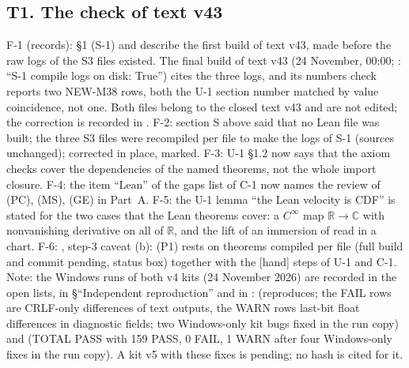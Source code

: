 \subsection*{T1. The check of text v43}
F-1 (records):  \S1 (S-1) and  describe the first build of text v43, made before the raw logs of the S3 files existed. The final build of text v43 (24 November, 00:00; : ``S-1 compile logs on disk: True'') cites the three logs, and its numbers check reports two NEW-M38 rows, both the U-1 section number matched by value coincidence, not one. Both files belong to the closed text v43 and are not edited; the correction is recorded in . F-2: section S above said that no Lean file was built; the three S3 files were recompiled per file to make the logs of S-1 (sources unchanged); corrected in place, marked. F-3: U-1 \S1.2 now says that the axiom checks cover the dependencies of the named theorems, not the whole import closure. F-4: the item ``Lean'' of the gaps list of C-1 now names the review of (PC), (MS), (GE) in  Part~A. F-5: the U-1 lemma ``the Lean velocity is CDF'' is stated for the two cases that the Lean theorems cover: a $C^\infty$ map $\mathbb R\to\mathbb C$ with nonvanishing derivative on all of $\mathbb R$, and the lift of an immersion of  read in a chart. F-6: , step-3 caveat (b): (P1) rests on theorems compiled per file (full build and commit pending, status box) together with the [hand] steps of U-1 and C-1. Note: the Windows runs of both v4 kits (24 November 2026) are recorded in the open lists, in  \S``Independent reproduction'' and in :  (reproduces; the FAIL rows are CRLF-only differences of text outputs, the WARN rows last-bit float differences in diagnostic fields; two Windows-only kit bugs fixed in the run copy) and  (TOTAL PASS with 159 PASS, 0 FAIL, 1 WARN after four Windows-only fixes in the run copy). A kit v5 with these fixes is pending; no hash is cited for it.
